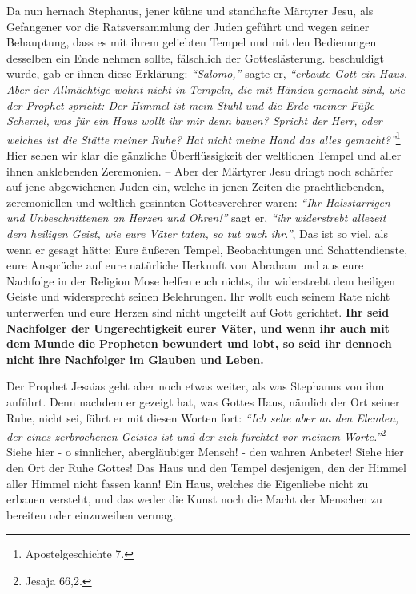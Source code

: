Da nun hernach Stephanus, jener kühne und standhafte Märtyrer Jesu, als
Gefangener vor die Ratsversammlung der Juden geführt und wegen seiner
Behauptung, dass es mit ihrem geliebten Tempel und mit den Bedienungen desselben
ein Ende nehmen sollte, fälschlich der Gotteslästerung.
beschuldigt wurde, gab
er ihnen diese Erklärung:
\textit{"`Salomo,"'} sagte er,
\textit{"`erbaute Gott ein Haus. Aber der Allmächtige wohnt nicht in Tempeln,
die mit Händen gemacht sind, wie der Prophet spricht: Der Himmel ist mein Stuhl
und die Erde meiner Füße Schemel, was für ein Haus wollt ihr mir denn bauen?
Spricht der Herr, oder welches ist die Stätte meiner Ruhe? Hat nicht meine Hand
das alles gemacht?"'}\footnote{Apostelgeschichte 7.}
Hier sehen wir klar die gänzliche Überflüssigkeit der weltlichen
Tempel und aller ihnen anklebenden Zeremonien. -- Aber der
Märtyrer Jesu dringt
noch schärfer auf jene abgewichenen Juden
ein, welche in jenen Zeiten die
prachtliebenden, zeremoniellen und weltlich gesinnten Gottesverehrer waren:
\textit{"`Ihr Halsstarrigen und Unbeschnittenen an Herzen und Ohren!"'} sagt er,
\textit{"`ihr widerstrebt allezeit dem heiligen Geist, wie eure Väter taten,
so tut auch
ihr."'}, Das ist so viel, als wenn er gesagt hätte: Eure äußeren Tempel,
Beobachtungen und Schattendienste, eure Ansprüche auf eure natürliche Herkunft
von Abraham und aus eure Nachfolge in der Religion
Mose helfen euch nichts,
ihr widerstrebt dem heiligen Geiste und widersprecht seinen Belehrungen. Ihr
wollt euch seinem Rate nicht unterwerfen und eure Herzen sind nicht ungeteilt
auf Gott gerichtet. \label{ref:05_05_wahre_nachfolge}
\textbf{Ihr seid Nachfolger der Ungerechtigkeit eurer Väter, und
wenn ihr auch mit dem Munde die Propheten bewundert und lobt, so seid ihr
dennoch nicht ihre Nachfolger im Glauben und Leben.}

\medskip

Der Prophet Jesaias geht aber noch etwas weiter, als
was Stephanus von ihm
anführt. Denn nachdem er gezeigt hat, was Gottes Haus, nämlich der Ort seiner
Ruhe, nicht sei, fährt er mit diesen Worten fort:
\textit{"`Ich sehe aber an den Elenden, der eines zerbrochenen Geistes ist und
der sich fürchtet vor meinem Worte."'}\footnote{Jesaja 66,2.}
Siehe hier - o sinnlicher, abergläubiger Mensch! - den
wahren Anbeter! Siehe hier den Ort der Ruhe Gottes! Das Haus und den Tempel
desjenigen, den der Himmel aller Himmel nicht fassen kann! Ein Haus, welches
die Eigenliebe nicht zu erbauen versteht, und das weder die Kunst noch die Macht
der Menschen zu bereiten oder einzuweihen vermag.

